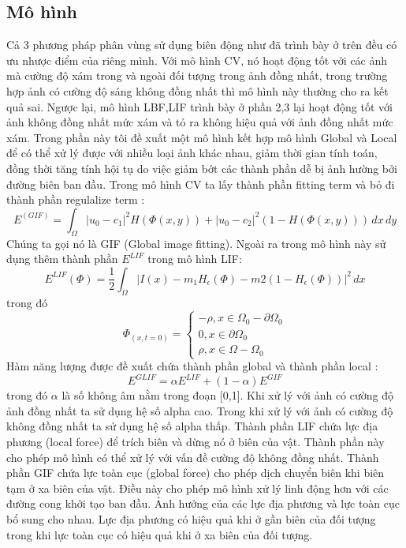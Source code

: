 \documentclass[12pt,oneside,a4]{report}
\begin{document}
\subsection{Mô hình}
Cả 3 phương pháp phân vùng sử dụng biên động như đã trình bày ở trên đều có ưu nhược điểm của riêng mình. Với mô hình CV, nó hoạt động tốt với các ảnh mà cường độ xám trong và ngoài đối tượng trong ảnh đồng nhất, trong trường hợp  ảnh có cường độ sáng không đồng nhất thì mô hình này thường cho ra kết quả sai. Ngược lại, mô hình LBF,LIF trình bày ở phần 2,3 lại hoạt động tốt với ảnh không đồng nhất mức xám và tỏ ra không hiệu quả với ảnh đồng nhất mức xám. Trong phần này tôi đề xuất một mô hình kết hợp mô hình Global và Local để có thể xử lý được với nhiều loại ảnh khác nhau, giảm thời gian tính toán, đồng thời tăng tính hội tụ do việc giảm bớt các thành phần dễ bị ảnh hường bởi đường biên ban đầu. Trong mô hình CV ta lấy thành phần fitting term và bỏ đi thành phần regulalize term :
\begin{equation}
E^(GIF)=\int_{\Omega} |u_0-c_1|^2H(\Phi(x,y))+ |u_0-c_2|^2(1-H(\Phi(x,y))) \,dx\,dy
\end{equation} 
Chúng ta gọi nó là GIF (Global image fitting). Ngoài ra trong mô hình này sử dụng thêm thành phần $E^{LIF}$ trong mô hình LIF:
\begin{equation}
E^{LIF}(\Phi)=\dfrac{1}{2}\int_{\Omega}|I(x)-m_1H_{\epsilon}(\Phi)-m2(1-H_{\epsilon}(\Phi))|^2\,dx
\end{equation}
trong đó 
\begin{equation}
\Phi_(x,t=0)=\begin{cases}
-\rho, x\in \Omega_0 -\partial \Omega_0\\
0, x\in \partial \Omega_0\\
\rho, x\in \Omega- \Omega_0
\end{cases}
\end{equation}
Hàm năng lượng được đề xuất chứa thành phần global và thành phần local :
\begin{equation}
E^{GLIF}=\alpha E^{LIF}+(1-\alpha)E^{GIF}
\end{equation}
trong đó $\alpha$ là số không âm nằm trong đoạn [0,1]. Khi xử lý với ảnh có cường độ ảnh đồng nhất ta sử dụng hệ số alpha cao. Trong khi xử lý với ảnh có cường độ không đồng nhất ta sử dụng hệ số alpha thấp. Thành phần LIF chứa lực địa phương (local force) để trích biên và dừng nó ở biên của vật. Thành phần này cho phép mô hình có thể xử lý với vấn đề cường độ không đồng nhất. Thành phần GIF chứa lực toàn cục (global force) cho phép dịch chuyển biên khi biên tạm ở xa biên của vật. Điều này cho phép mô hình xử lý linh động hơn với các đường cong khởi tạo ban đầu.
Ảnh hưởng của các lực địa phương và lực toàn cục bổ sung cho nhau. Lực địa phương có hiệu quả khi ở gần biên của đối tượng trong khi lực toàn cục có hiệu quả khi ở xa biên của đối tượng. 
\end{document}
